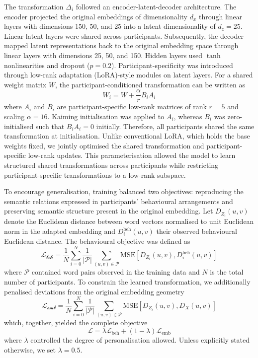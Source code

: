 \documentclass[pdflatex,sn-mathphys]{sn-jnl}
\begin{document}
The transformation $\Delta_i$ followed an encoder-latent-decoder architecture. The encoder projected the original embeddings of dimensionality $d_x$ through linear layers with dimensions 150, 50, and 25 into a latent dimensionality of $d_z = 25$. Linear latent layers were shared across participants. Subsequently, the decoder mapped latent representations back to the original embedding space through linear layers with dimensions 25, 50, and 150. Hidden layers used $\tanh$ nonlinearities and dropout ($p = 0.2$). Participant-specificity was introduced through low-rank adaptation\cite{lora} (LoRA)-style modules on latent layers. For a shared weight matrix $W$, the participant-conditioned transformation can be written as
\begin{equation*}
    W_i = W + \frac{\alpha}{r}B_i A_i
\end{equation*}
where $A_i$ and $B_i$ are participant-specific low-rank matrices of rank $r = 5$ and scaling $\alpha = 16$. Kaiming initialisation was applied to $A_i$, whereas $B_i$ was zero-initialised such that $B_i A_i = 0$ initially. Therefore, all participants shared the same transformation at initialisation. Unlike conventional LoRA, which holds the base weights fixed, we jointly optimised the shared transformation and participant-specific low-rank updates. This parameterisation allowed the model to learn structured shared transformations across participants while restricting participant-specific transformations to a low-rank subspace.

To encourage generalisation, training balanced two objectives: reproducing the semantic relations expressed in participants' behavioural arrangements and preserving semantic structure present in the original embedding. Let $D_{Z_i}(u, v)$ denote the Euclidean distance between word vectors normalised to unit Euclidean norm in the adapted embedding and $D_i^{\textrm{beh}}(u, v)$ their observed behavioural Euclidean distance. The behavioural objective was defined as
\begin{equation*}
    \mathcal{L_{\textrm{beh}}} = \frac{1}{N}\sum_{i=0}^{N}\frac{1}{\lvert\mathcal{P}\rvert}\sum_{(u, v)\in\mathcal{P}} \textrm{MSE}\left[D_{Z_{i}}(u, v), D_i^{\textrm{beh}}(u, v)\right]
\end{equation*}
where $\mathcal{P}$ contained word pairs observed in the training data and $N$ is the total number of participants. To constrain the learned transformation, we additionally penalised deviations from the original embedding geometry
\begin{equation*}
    \mathcal{L_{\textrm{emb}}} = \frac{1}{N}\sum_{i=0}^{N}\frac{1}{\lvert\mathcal{P}\rvert}\sum_{(u, v)\in\mathcal{P}} \textrm{MSE}\left[D_{Z_{i}}(u, v), D_X(u, v)\right]
\end{equation*}
which, together, yielded the complete objective
\begin{equation*}
    \mathcal{L} = \lambda\mathcal{L}_{\textrm{beh}} + (1 - \lambda)\mathcal{L}_{\textrm{emb}}
\end{equation*}
where $\lambda$ controlled the degree of personalisation allowed. Unless explicitly stated otherwise, we set $\lambda = 0.5$. 
\end{document}
